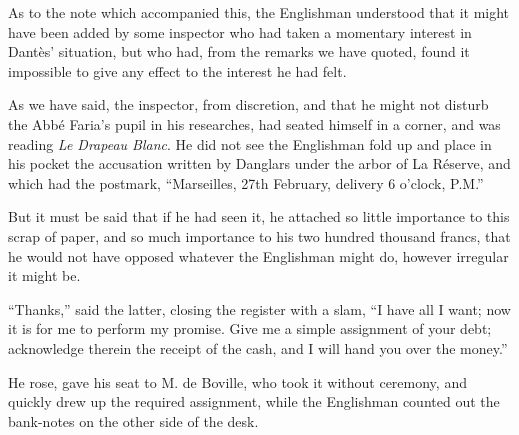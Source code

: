As to the note which accompanied this, the Englishman understood that
it might have been added by some inspector who had taken a momentary
interest in Dantès’ situation, but who had, from the remarks we have
quoted, found it impossible to give any effect to the interest he had
felt.

As we have said, the inspector, from discretion, and that he might not
disturb the Abbé Faria’s pupil in his researches, had seated himself in
a corner, and was reading \textit{Le Drapeau Blanc}. He did not see the
Englishman fold up and place in his pocket the accusation written by
Danglars under the arbor of La Réserve, and which had the postmark,
“Marseilles, 27th February, delivery 6 o’clock, P.M.”

But it must be said that if he had seen it, he attached so little
importance to this scrap of paper, and so much importance to his two
hundred thousand francs, that he would not have opposed whatever the
Englishman might do, however irregular it might be.

“Thanks,” said the latter, closing the register with a slam, “I have
all I want; now it is for me to perform my promise. Give me a simple
assignment of your debt; acknowledge therein the receipt of the cash,
and I will hand you over the money.”

He rose, gave his seat to M. de Boville, who took it without ceremony,
and quickly drew up the required assignment, while the Englishman
counted out the bank-notes on the other side of the desk.
